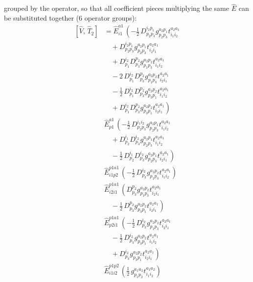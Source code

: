 \documentclass[11pt]{article}
\begin{document}
grouped by the operator, so that all coefficient pieces multiplying the same $\hat{E}$ can be substituted together (6 operator groups):
\begin{align}
\left[\hat{V},\, \hat{T}_{2}\right] &= \hat{E}^{a1}_{i1}\,\left(- \tfrac{1}{2}\, D^{i_{2}p_{1}}_{p_{2}p_{3}} g^{a_{2}p_{1}}_{p_{2}p_{3}} t^{a_{2}a_{1}}_{i_{1}i_{2}} \right. \\
&\left.\quad + D^{i_{2}p_{1}}_{p_{2}p_{3}} g^{a_{2}p_{1}}_{p_{2}p_{3}} t^{a_{2}a_{1}}_{i_{2}i_{1}} \right. \\
&\left.\quad + D^{i_{2}}_{p_{1}} D^{p_{2}}_{p_{3}} g^{a_{2}p_{2}}_{p_{1}p_{3}} t^{a_{2}a_{1}}_{i_{1}i_{2}} \right. \\
&\left.\quad - 2\, D^{i_{2}}_{p_{1}} D^{p_{2}}_{p_{3}} g^{a_{2}p_{2}}_{p_{1}p_{3}} t^{a_{2}a_{1}}_{i_{2}i_{1}} \right. \\
&\left.\quad - \tfrac{1}{2}\, D^{i_{2}}_{p_{1}} D^{p_{2}}_{p_{3}} g^{a_{2}p_{2}}_{p_{3}p_{1}} t^{a_{2}a_{1}}_{i_{1}i_{2}} \right. \\
&\left.\quad + D^{i_{2}}_{p_{1}} D^{p_{2}}_{p_{3}} g^{a_{2}p_{2}}_{p_{3}p_{1}} t^{a_{2}a_{1}}_{i_{2}i_{1}} \right) \\
&\hat{E}^{a1}_{p1}\,\left(- \tfrac{1}{2}\, D^{i_{1}i_{2}}_{p_{2}p_{3}} g^{a_{2}p_{1}}_{p_{2}p_{3}} t^{a_{2}a_{1}}_{i_{1}i_{2}} \right. \\
&\left.\quad + D^{i_{1}}_{p_{2}} D^{i_{2}}_{p_{3}} g^{a_{2}p_{1}}_{p_{2}p_{3}} t^{a_{2}a_{1}}_{i_{1}i_{2}} \right. \\
&\left.\quad - \tfrac{1}{2}\, D^{i_{1}}_{p_{2}} D^{i_{2}}_{p_{3}} g^{a_{2}p_{1}}_{p_{2}p_{3}} t^{a_{2}a_{1}}_{i_{2}i_{1}} \right) \\
&\hat{E}^{p1a1}_{i1p2}\,\left(- \tfrac{1}{2}\, D^{i_{2}}_{p_{3}} g^{a_{2}p_{2}}_{p_{1}p_{3}} t^{a_{2}a_{1}}_{i_{1}i_{2}} \right) \\
&\hat{E}^{p1a1}_{i2i1}\,\left(D^{p_{2}}_{p_{3}} g^{a_{2}p_{2}}_{p_{1}p_{3}} t^{a_{2}a_{1}}_{i_{2}i_{1}} \right. \\
&\left.\quad - \tfrac{1}{2}\, D^{p_{2}}_{p_{3}} g^{a_{2}p_{2}}_{p_{3}p_{1}} t^{a_{2}a_{1}}_{i_{2}i_{1}} \right) \\
&\hat{E}^{p1a1}_{p2i1}\,\left(- \tfrac{1}{2}\, D^{i_{2}}_{p_{3}} g^{a_{2}p_{2}}_{p_{1}p_{3}} t^{a_{2}a_{1}}_{i_{2}i_{1}} \right. \\
&\left.\quad - \tfrac{1}{2}\, D^{i_{2}}_{p_{3}} g^{a_{2}p_{2}}_{p_{3}p_{1}} t^{a_{2}a_{1}}_{i_{1}i_{2}} \right. \\
&\left.\quad + D^{i_{2}}_{p_{3}} g^{a_{2}p_{2}}_{p_{3}p_{1}} t^{a_{2}a_{1}}_{i_{2}i_{1}} \right) \\
&\hat{E}^{p1p2}_{i1i2}\,\left(\tfrac{1}{2}\, g^{a_{1}a_{2}}_{p_{1}p_{2}} t^{a_{1}a_{2}}_{i_{1}i_{2}} \right)
\end{align}
\end{document}
